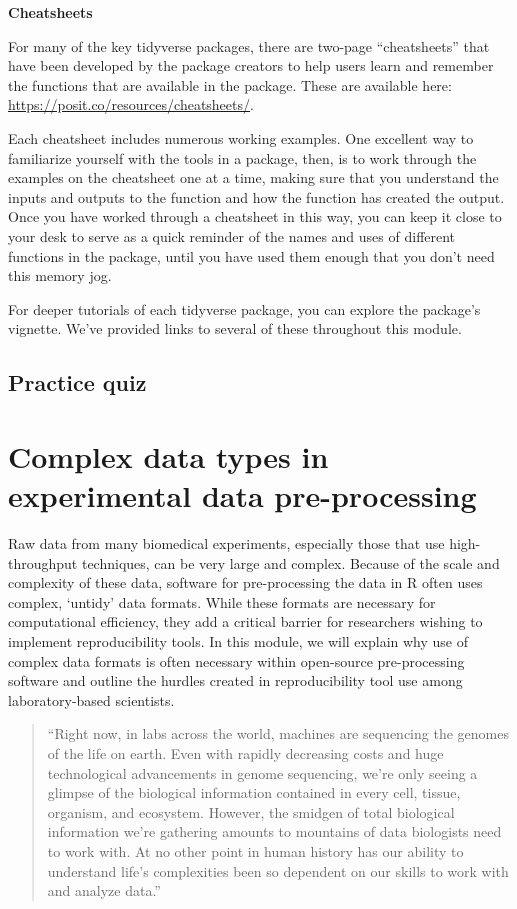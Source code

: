 \documentclass[]{tufte-book}
\begin{document}
\textbf{Cheatsheets}

For many of the key tidyverse packages, there are two-page ``cheatsheets'' that
have been developed by the package creators to help users learn and remember
the functions that are available in the package. These are available here:
\url{https://posit.co/resources/cheatsheets/}.

Each cheatsheet includes numerous working examples. One excellent way to
familiarize yourself with the tools in a package, then, is to work through the
examples on the cheatsheet one at a time, making sure that you understand the
inputs and outputs to the function and how the function has created the output.
Once you have worked through a cheatsheet in this way, you can keep it close
to your desk to serve as a quick reminder of the names and uses of different
functions in the package, until you have used them enough that you don't need
this memory jog.

For deeper tutorials of each tidyverse package, you can explore the
package's vignette. We've provided links to several of these throughout this
module.

\subsection{Practice quiz}\label{practice-quiz}

\section{Complex data types in experimental data pre-processing}\label{module15}

Raw data from many biomedical experiments, especially those that use
high-throughput techniques, can be very large and complex. Because of the scale
and complexity of these data, software for pre-processing the data in R often
uses complex, `untidy' data formats. While these formats are necessary for
computational efficiency, they add a critical barrier for researchers wishing to
implement reproducibility tools. In this module, we will explain why use of
complex data formats is often necessary within open-source pre-processing
software and outline the hurdles created in reproducibility tool use among
laboratory-based scientists.

\begin{quote}
``Right now, in labs across the world, machines are sequencing the genomes of
the life on earth. Even with rapidly decreasing costs and huge technological
advancements in genome sequencing, we're only seeing a glimpse of the biological
information contained in every cell, tissue, organism, and ecosystem. However,
the smidgen of total biological information we're gathering amounts to mountains
of data biologists need to work with. At no other point in human history has our
ability to understand life's complexities been so dependent on our skills to
work with and analyze data.'' \citep{buffalo2015bioinformatics}
\end{quote}
\end{document}
